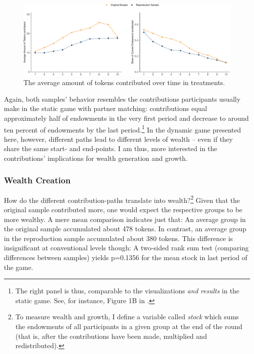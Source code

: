 \documentclass[
  authoryear,
  preprint,
  3p]{elsarticle}
\begin{document}
\begin{figure}

{\centering \includegraphics{paper_files/figure-pdf/fig-share-of-contributions-1.pdf}

}

\caption{\label{fig-share-of-contributions}The average amount of tokens
contributed over time in treatments.}

\end{figure}

Again, both samples' behavior resembles the contributions participants
usually make in the static game with partner matching: contributions
equal approximately half of endowments in the very first period and
decrease to around ten percent of endowments by the last
period.\footnote{The right panel is thus, comparable to the
  visualizations \emph{and results} in the static game. See, for
  instance, Figure 1B in \citet[p.986]{fehrgaechter2000}.} In the
dynamic game presented here, however, different paths lead to different
levels of wealth -- even if they share the same start- and end-points. I
am thus, more interested in the contributions' implications for wealth
generation and growth.

\hypertarget{sec-wealth}{%
\subsubsection{Wealth Creation}\label{sec-wealth}}

How do the different contribution-paths translate into
wealth?\footnote{To measure wealth and growth, I define a variable
  called \emph{stock} which sums the endowments of all participants in a
  given group at the end of the round (that is, after the contributions
  have been made, multiplied and redistributed).} Given that the
original sample contributed more, one would expect the respective groups
to be more wealthy. A mere mean comparison indicates just that: An
average group in the original sample accumulated about 478 tokens. In
contrast, an average group in the reproduction sample accumulated about
380 tokens. This difference is insignificant at conventional levels
though: A two-sided rank sum test (comparing differences between
samples) yields p=0.1356 for the mean stock in last period of the game.
\end{document}
